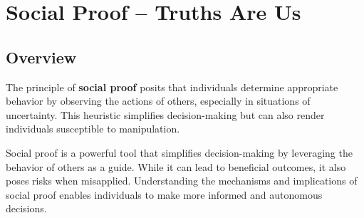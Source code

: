 \section{Social Proof – Truths Are Us}

\subsection*{Overview}
The principle of \textbf{social proof} posits that individuals determine appropriate behavior by observing the actions of others, especially in situations of uncertainty. This heuristic simplifies decision-making but can also render individuals susceptible to manipulation.

Social proof is a powerful tool that simplifies decision-making by leveraging the behavior of others as a guide. While it can lead to beneficial outcomes, it also poses risks when misapplied. Understanding the mechanisms and implications of social proof enables individuals to make more informed and autonomous decisions.

